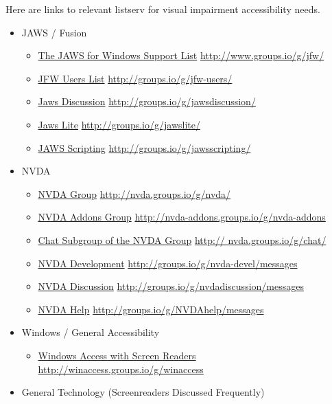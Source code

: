 \documentclass[12pt,letterpaper,twoside]{extreport}
\begin{document}
\begin{appendices}
Here are links to relevant listserv for visual impairment accessibility needs.
\begin{itemize}[leftmargin=*]
\item JAWS / Fusion
\begin{itemize}[leftmargin=2em]
\item \href{http://www.groups.io/g/jfw/}{The JAWS for Windows Support List}  \break\url{http://www.groups.io/g/jfw/} 
\item \href{http://groups.io/g/jfw-users/}{JFW Users List}  \break\url{http://groups.io/g/jfw-users/}
\item \href{http://groups.io/g/jawsdiscussion/}{Jaws Discussion}  \break\url{http://groups.io/g/jawsdiscussion/}
\item \href{http://groups.io/g/jawslite/}{Jaws Lite}  \break\url{http://groups.io/g/jawslite/}
\item \href{http://groups.io/g/jawsscripting/}{JAWS Scripting}  \break\url{http://groups.io/g/jawsscripting/}
\end{itemize}
\item NVDA
\begin{itemize}[leftmargin=2em]
\item \href{http://nvda.groups.io/g/nvda/ }{NVDA Group}  \break\url{http://nvda.groups.io/g/nvda/ }
\item \href{http://nvda-addons.groups.io/g/nvda-addons}{NVDA Addons Group}  \break\url{http://nvda-addons.groups.io/g/nvda-addons}
\item \href{http://nvda.groups.io/g/chat/ }{Chat Subgroup of the NVDA Group}  \break\url{http:// nvda.groups.io/g/chat/ }
\item \href{http://groups.io/g/nvda-devel/messages}{NVDA Development}  \break\url{http://groups.io/g/nvda-devel/messages}
\item \href{http://groups.io/g/nvdadiscussion/messages}{NVDA Discussion}  \break\url{http://groups.io/g/nvdadiscussion/messages}
\item \href{http://groups.io/g/NVDAhelp/messages}{NVDA Help}  \break\url{http://groups.io/g/NVDAhelp/messages}
\end{itemize}
\item Windows / General Accessibility
\begin{itemize}[leftmargin=2em]
\item \href{http://winaccess.groups.io/g/winaccess}{Windows Access with Screen Readers}  \break\url{http://winaccess.groups.io/g/winaccess}
\end{itemize}
\item General Technology (Screenreaders Discussed Frequently)

\end{itemize}
\end{appendices}
\end{document}
